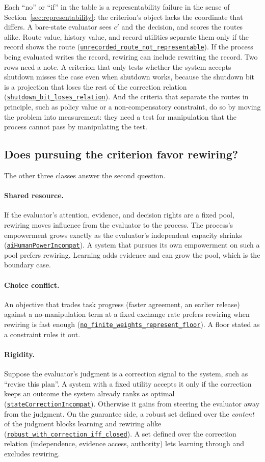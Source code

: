 \documentclass[11pt]{article}
\newcommand{\lean}[1]{\hyperref[lean:#1]{\nolinkurl{#1}}}
\begin{document}
Each ``no'' or ``if'' in the table is a representability failure in the sense of Section~\ref{sec:representability}: the criterion's object lacks the coordinate that differs.
A bare-state evaluator sees $c'$ and the decision, and scores the routes alike.
Route value, history value, and record utilities separate them only if the record shows the route (\lean{unrecorded_route_not_representable}).
If the process being evaluated writes the record, rewiring can include rewriting the record.
Two rows need a note.
A criterion that only tests whether the system accepts shutdown misses the case even when shutdown works, because the shutdown bit is a projection that loses the rest of the correction relation (\lean{shutdown_bit_loses_relation}).
And the criteria that separate the routes in principle, such as policy value or a non-compensatory constraint, do so by moving the problem into measurement: they need a test for manipulation that the process cannot pass by manipulating the test.

\subsection{Does pursuing the criterion favor rewiring?}
\label{sec:case-pursue}

The other three classes answer the second question.

\paragraph{Shared resource.}
If the evaluator's attention, evidence, and decision rights are a fixed pool, rewiring moves influence from the evaluator to the process.
The process's empowerment grows exactly as the evaluator's independent capacity shrinks (\lean{aiHumanPowerIncompat}).
A system that pursues its own empowerment on such a pool prefers rewiring.
Learning adds evidence and can grow the pool, which is the boundary case.

\paragraph{Choice conflict.}
An objective that trades task progress (faster agreement, an earlier release) against a no-manipulation term at a fixed exchange rate prefers rewiring when rewiring is fast enough (\lean{no_finite_weights_represent_floor}).
A floor stated as a constraint rules it out.

\paragraph{Rigidity.}
Suppose the evaluator's judgment is a correction signal to the system, such as ``revise this plan''.
A system with a fixed utility accepts it only if the correction keeps an outcome the system already ranks as optimal (\lean{stateCorrectionIncompat}).
Otherwise it gains from steering the evaluator away from the judgment.
On the guarantee side, a robust set defined over the \emph{content} of the judgment blocks learning and rewiring alike (\lean{robust_with_correction_iff_closed}).
A set defined over the correction relation (independence, evidence access, authority) lets learning through and excludes rewiring.
\end{document}
